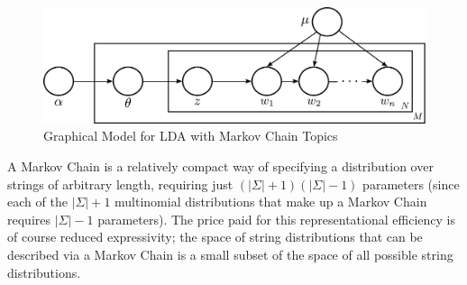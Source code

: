 \documentclass[10pt]{article}
\begin{document}
\begin{figure}[h!]
\begin{centering}
    \includegraphics[width=\textwidth]{./lda_mm_plate.pdf}
\par\end{centering}
\caption{Graphical Model for LDA with Markov Chain Topics\label{fig:lda-graphical-markov}}
\end{figure}

A Markov Chain is a relatively compact way of specifying a distribution over strings of arbitrary length, requiring just $(|\Sigma| + 1)(|\Sigma| - 1)$ parameters (since each of the $|\Sigma| + 1$ multinomial distributions that make up a Markov Chain requires $|\Sigma| - 1$ parameters). The price paid for this representational efficiency is of course reduced expressivity; the space of string distributions that can be described via a Markov Chain is a small subset of the space of all possible string distributions.
\end{document}
